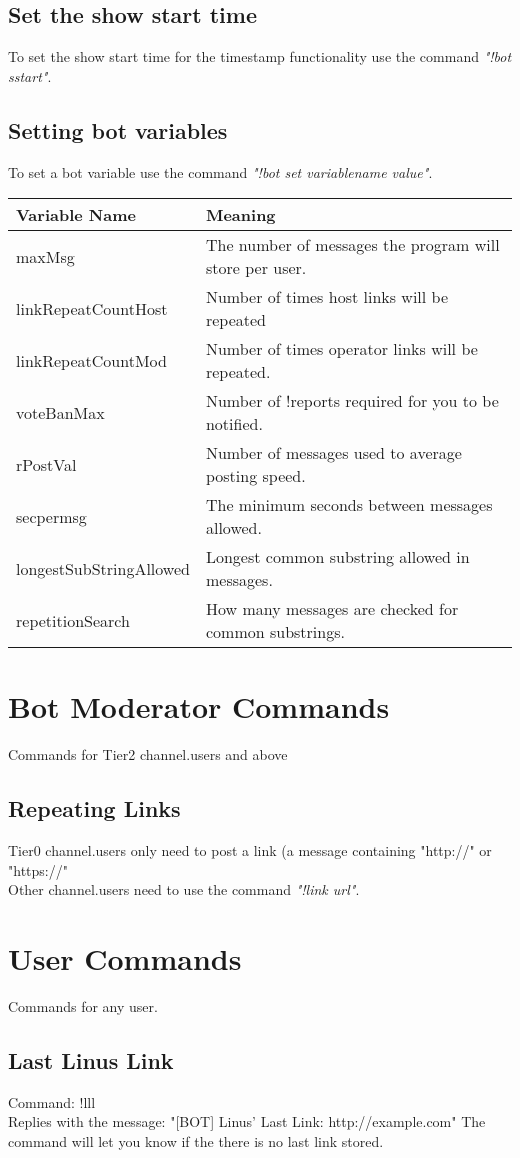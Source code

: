\documentclass[10pt]{article}
\begin{document}
\subsection{Set the show start time}
To set the show start time for the timestamp functionality use the command \emph{"!bot sstart"}.
\subsection{Setting bot variables}
To set a bot variable use the command \emph{"!bot set variablename value"}.\\
\begin{tabular}{| l | l |}
\hline
Variable Name & Meaning\\ \hline
maxMsg & The number of messages the program will store per user.\\ \hline
linkRepeatCountHost & Number of times host links will be repeated\\ \hline
linkRepeatCountMod & Number of times operator links will be repeated.\\ \hline
voteBanMax & Number of !reports required for you to be notified.\\ \hline
rPostVal & Number of messages used to average posting speed.\\ \hline
secpermsg & The minimum seconds between messages allowed.\\ \hline
longestSubStringAllowed & Longest common substring allowed in messages.\\ \hline
repetitionSearch & How many messages are checked for common substrings.\\ \hline
\end{tabular}
\section{Bot Moderator Commands}
Commands for Tier2 channel.users and above
\subsection{Repeating Links}
Tier0 channel.users only need to post a link (a message containing "http://" or "https://"\\
Other channel.users need to use the command \emph{"!link url"}.
\section{User Commands}
Commands for any user.
\subsection{Last Linus Link}
Command: !lll\\
Replies with the message: "[BOT] Linus' Last Link: http://example.com"
The command will let you know if the there is no last link stored.
\end{document}
